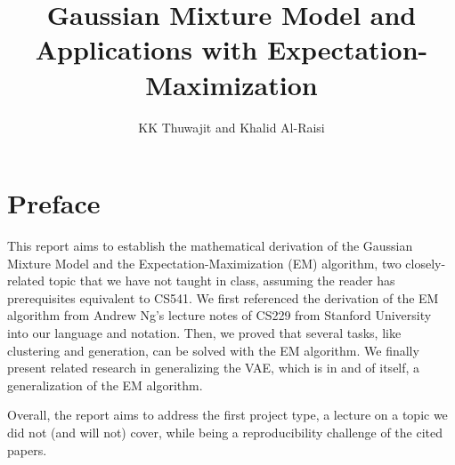 \documentclass{article}
\title{Gaussian Mixture Model and Applications with Expectation-Maximization}
\author{KK Thuwajit and Khalid Al-Raisi}
\begin{document}
\newtheorem{theorem}{Theorem}
\newtheorem{lemma}{Lemma}
\theoremstyle{definition}
\newtheorem{definition}{Definition}
\newtheorem{example}{Example}
\maketitle
\tableofcontents
\newpage
\section*{Preface}
This report aims to establish the mathematical derivation of the Gaussian Mixture Model and the Expectation-Maximization (EM) algorithm, two closely-related topic that we have not taught in class, assuming the reader has prerequisites equivalent to CS541. We first referenced the derivation of the EM algorithm from Andrew Ng's lecture notes of CS229 from Stanford University \cite{em_notes} into our language and notation. Then, we proved that several tasks, like clustering and generation, can be solved with the EM algorithm. We finally present related research in generalizing the VAE, which is in and of itself, a generalization of the EM algorithm.

Overall, the report aims to address the first project type, a lecture on a topic we did not (and will not) cover, while being a reproducibility challenge of the cited papers.
\newpage

\setcounter{section}{-1}









\end{document}

